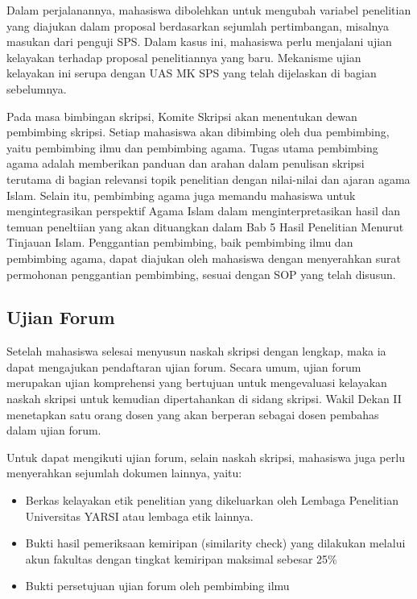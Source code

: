 \documentclass[
  indonesian,
  letterpaper,
]{scrbook}
\providecommand{\tightlist}{%
  \setlength{\itemsep}{0pt}\setlength{\parskip}{0pt}}
\begin{document}
Dalam perjalanannya, mahasiswa dibolehkan untuk mengubah variabel
penelitian yang diajukan dalam proposal berdasarkan sejumlah
pertimbangan, misalnya masukan dari penguji SPS. Dalam kasus ini,
mahasiswa perlu menjalani ujian kelayakan terhadap proposal
penelitiannya yang baru. Mekanisme ujian kelayakan ini serupa dengan UAS
MK SPS yang telah dijelaskan di bagian sebelumnya.

Pada masa bimbingan skripsi, Komite Skripsi akan menentukan dewan
pembimbing skripsi. Setiap mahasiswa akan dibimbing oleh dua pembimbing,
yaitu pembimbing ilmu dan pembimbing agama. Tugas utama pembimbing agama
adalah memberikan panduan dan arahan dalam penulisan skripsi terutama di
bagian relevansi topik penelitian dengan nilai-nilai dan ajaran agama
Islam. Selain itu, pembimbing agama juga memandu mahasiswa untuk
mengintegrasikan perspektif Agama Islam dalam menginterpretasikan hasil
dan temuan peneltiian yang akan dituangkan dalam Bab 5 Hasil Penelitian
Menurut Tinjauan Islam. Penggantian pembimbing, baik pembimbing ilmu dan
pembimbing agama, dapat diajukan oleh mahasiswa dengan menyerahkan surat
permohonan penggantian pembimbing, sesuai dengan SOP yang telah disusun.

\subsection*{Ujian Forum}\label{ujian-forum}

Setelah mahasiswa selesai menyusun naskah skripsi dengan lengkap, maka
ia dapat mengajukan pendaftaran ujian forum. Secara umum, ujian forum
merupakan ujian komprehensi yang bertujuan untuk mengevaluasi kelayakan
naskah skripsi untuk kemudian dipertahankan di sidang skripsi. Wakil
Dekan II menetapkan satu orang dosen yang akan berperan sebagai dosen
pembahas dalam ujian forum.

Untuk dapat mengikuti ujian forum, selain naskah skripsi, mahasiswa juga
perlu menyerahkan sejumlah dokumen lainnya, yaitu:

\begin{itemize}
\tightlist
\item
  Berkas kelayakan etik penelitian yang dikeluarkan oleh Lembaga
  Penelitian Universitas YARSI atau lembaga etik lainnya.
\item
  Bukti hasil pemeriksaan kemiripan (similarity check) yang dilakukan
  melalui akun fakultas dengan tingkat kemiripan maksimal sebesar 25\%
\item
  Bukti persetujuan ujian forum oleh pembimbing ilmu
\end{itemize}
\end{document}
